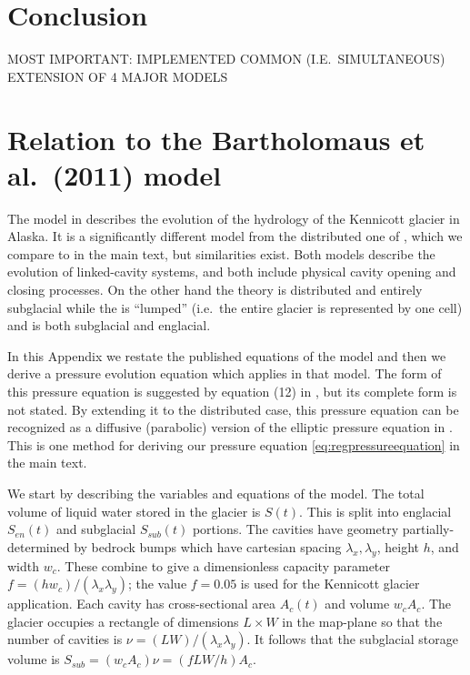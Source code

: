 \documentclass[11pt,final]{amsart}
\begin{document}
\section{Conclusion}  \label{sec:conclusion}

MOST IMPORTANT:  IMPLEMENTED COMMON (I.E.~SIMULTANEOUS) EXTENSION OF 4 MAJOR MODELS


\small

\normalsize


\appendix
\small

\section{Relation to the Bartholomaus et al.~(2011) model}  \label{app:barth}

The model in \cite{Bartholomausetal2011} describes the evolution of the hydrology of the Kennicott glacier in Alaska.  It is a significantly different model from the distributed one of \cite{Schoofetal2012}, which we compare to in the main text, but similarities exist.  Both models describe the evolution of linked-cavity systems, and both include physical cavity opening and closing processes.  On the other hand the \cite{Schoofetal2012} theory is distributed and entirely subglacial while the \cite{Bartholomausetal2011} is ``lumped'' (i.e.~the entire glacier is represented by one cell) and is both subglacial and englacial.

In this Appendix we restate the published equations of the \cite{Bartholomausetal2011} model and then we derive a pressure evolution equation which applies in that model.  The form of this pressure equation is suggested by equation (12) in \cite{Bartholomausetal2011}, but its complete form is not stated.  By extending it to the distributed case, this pressure equation can be recognized as a diffusive (parabolic) version of the elliptic pressure equation in \cite{Schoofetal2012}.  This is one method for deriving our pressure equation \eqref{eq:regpressureequation} in the main text.

We start by describing the variables and equations of the \cite{Bartholomausetal2011} model.  The total volume of liquid water stored in the glacier is $S(t)$.  This is split into englacial $S_{en}(t)$ and subglacial $S_{sub}(t)$ portions.  The cavities have geometry partially-determined by bedrock bumps which have cartesian spacing $\lambda_x,\lambda_y$, height $h$, and width $w_c$.  These combine to give a dimensionless capacity parameter $f=(h w_c)/(\lambda_x \lambda_y)$; the value $f=0.05$ is used for the Kennicott glacier application.  Each cavity has cross-sectional area $A_c(t)$ and volume $w_c A_c$.  The glacier occupies a rectangle of dimensions $L\times W$ in the map-plane so that the number of cavities is $\nu = (LW)/(\lambda_x\lambda_y)$.  It follows that the subglacial storage volume is $S_{sub} = (w_c A_c) \nu = (f L W/h) A_c$.
\end{document}
